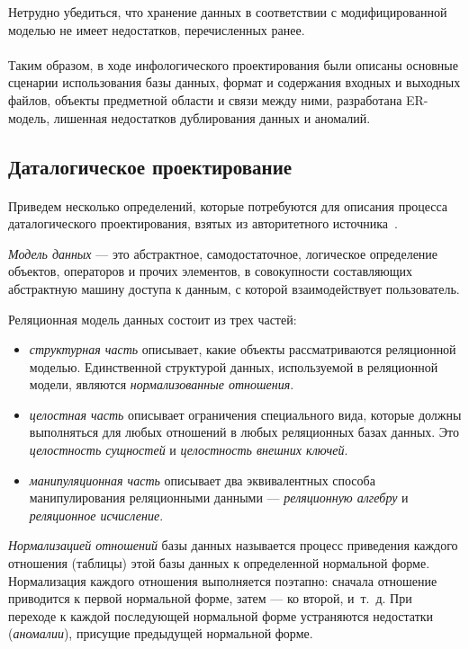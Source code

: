 Нетрудно убедиться, что хранение данных в соответствии с модифицированной моделью не имеет
недостатков, перечисленных ранее.

\paragraph{}
Таким образом, в ходе инфологического проектирования были описаны основные
сценарии использования базы данных, формат и содержания входных и выходных файлов,
объекты предметной области и связи между ними, разработана ER-модель, лишенная
недостатков дублирования данных и аномалий.

\subsection{Даталогическое проектирование}
\label{ssub:db_data_stage}

\paragraph{}
Приведем несколько определений, которые потребуются для описания процесса
даталогического проектирования, взятых из авторитетного источника~\cite{date05}.

\textit{Модель данных} --- это абстрактное, самодостаточное, логическое определение
объектов, операторов и прочих элементов, в совокупности составляющих абстрактную
 машину доступа к данным, с которой взаимодействует пользователь.

Реляционная модель данных состоит из трех частей:
\begin{itemize}
\item
  \textit{структурная часть} описывает, какие объекты рассматриваются реляционной моделью.
  Единственной структурой данных, используемой в реляционной модели,
  являются \textit{нормализованные отношения}.
\item
  \textit{целостная часть} описывает ограничения специального вида,
  которые должны выполняться для любых отношений в любых реляционных базах данных.
  Это \textit{целостность сущностей} и \textit{целостность внешних ключей}.
\item
  \textit{манипуляционная часть} описывает два эквивалентных способа
  манипулирования реляционными данными --- \textit{реляционную алгебру} и
  \textit{реляционное исчисление}.
\end{itemize}

\textit{Нормализацией отношений} базы данных называется процесс приведения каждого отношения
(таблицы) этой базы данных к определенной нормальной форме.
Нормализация каждого отношения выполняется поэтапно:
сначала отношение приводится к первой нормальной форме, затем --- ко второй, и~т.~д.
При переходе к каждой последующей нормальной форме устраняются недостатки
(\textit{аномалии}), присущие предыдущей нормальной форме.

